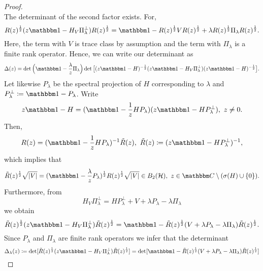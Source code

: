 \begin{proof}
\begin{equation*}
\end{equation*}
The determinant of the second factor exists. For,
\begin{equation*}
 R(z)^{\frac{1}{2}}(z\id-H_V\Pi_\lambda^\perp)R(z)^{\frac{1}{2}}
    = \id - R(z)^{\frac{1}{2}}VR(z)^{\frac{1}{2}} + \lambda R(z)^{\frac{1}{2}} \Pi_\lambda R(z)^{\frac{1}{2}} .
\end{equation*}
Here, the term with $V$ is trace class by assumption and the term with $\Pi_\lambda$ is a finite rank operator.
Hence, we can write our determinant as
\begin{equation*}
  \Delta(z) = \det\Big(\id-\frac{\lambda}{z}\Pi_\lambda\Big) \det\big[ (z\id-H)^{-\frac{1}{2}}(z\id-H_V\Pi_\lambda^\perp)(z\id-H)^{-\frac{1}{2}} \big] .
\end{equation*}
Let likewise $P_\lambda$ be the spectral projection of $H$ corresponding to $\lambda$ and $P_\lambda^\perp\coloneqq\id-P_\lambda$. Write
\begin{equation*}
  z\id-H = (\id-\frac{1}{z}HP_\lambda)(z\id-HP_\lambda^\perp),\ z\neq 0  .
\end{equation*}
Then,
\begin{equation*}
  R(z) = (\id-\frac{1}{z}HP_\lambda)^{-1} \tilde R(z),\  \tilde R(z) \coloneqq (z\id-HP_\lambda^\perp)^{-1}  ,
\end{equation*}
which implies that
\begin{equation*}
  \tilde R(z)^{\frac{1}{2}}\sqrt{|V|} = (\id-\frac{\lambda}{z}P_\lambda)^{\frac{1}{2}} R(z)^{\frac{1}{2}}\sqrt{|V|}
     \in B_2(\hilbert),\ z\in\C\setminus(\sigma(H)\cup\{0\}) .
\end{equation*}
Furthermore, from
\begin{equation*}
  H_V\Pi_\lambda^\perp = HP_\lambda^\perp + V + \lambda P_\lambda-\lambda\Pi_\lambda
\end{equation*}
we obtain
\begin{equation*}
  \tilde R(z)^{\frac{1}{2}}(z\id-H_V\Pi_\lambda^\perp)\tilde R(z)^{\frac{1}{2}}
    = \id - \tilde R(z)^{\frac{1}{2}}(V+\lambda P_\lambda - \lambda\Pi_\lambda)\tilde R(z)^{\frac{1}{2}} .
\end{equation*}
Since $P_\lambda$ and $\Pi_\lambda$ are finite rank operators we infer that the determinant
\begin{equation*}
   \Delta_\lambda(z) 
      \coloneqq \det [ \tilde R(z)^{\frac{1}{2}}(z\id-H_V\Pi_\lambda^\perp)\tilde R(z)^{\frac{1}{2}} ]
      = \det [ \id - \tilde R(z)^{\frac{1}{2}}(V+\lambda P_\lambda - \lambda\Pi_\lambda)\tilde R(z)^{\frac{1}{2}}]

\end{equation*}
\end{proof}
